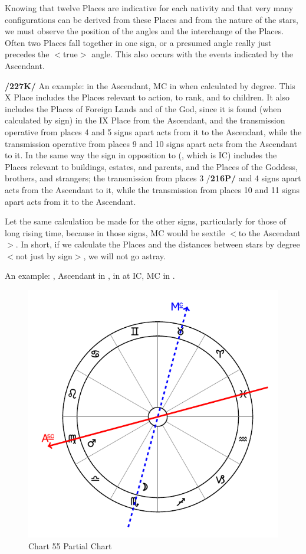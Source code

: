 Knowing that twelve Places are indicative for each nativity and that very many configurations can be derived from these Places and from
the nature of the stars, we must observe the position of the angles and the interchange of the Places. Often two Places fall together in one sign, or a presumed angle really just precedes the $<$true$>$ angle. This also occurs with the events indicated by the Ascendant.

\textbf{/227K/} An example: \Gemini\xspace in the Ascendant, MC in \Aquarius\xspace when calculated by degree. This X Place includes the Places relevant to action, to rank, and to children. It also includes the Places of Foreign Lands and of the God, since it is found (when calculated by sign) in the IX Place from the Ascendant, and the transmission operative from places 4 and 5 signs apart acts from it to the Ascendant, while the transmission operative from places 9 and 10 signs apart acts from the Ascendant to it. In the same way the
sign in opposition to \Aquarius\xspace (\Leo, which is IC) includes the Places relevant to buildings, estates, and parents, and the Places of the Goddess, brothers, and strangers; the transmission from places 3 /\textbf{216P/} and 4 signs apart acts from the Ascendant to it, while the transmission from places 10 and 11 signs apart acts from it to the Ascendant. 

Let the same calculation be made for the other signs, particularly for those of long rising time, because in those signs, MC would be sextile $<$to the Ascendant$>$. In short, if we calculate the Places and the distances between stars by degree $<$not just by sign$>$, we will not go astray.

An example: \Mars, Ascendant in \Virgo, \Moon\xspace in \Scorpio\xspace at IC, MC in \Taurus. 

\begin{figure}
\centering
\vspace{-20pt}
\includegraphics[width=.68\textwidth]{charts/5_09_2}
\caption{Chart 55 Partial Chart}
\label{fig:chart55}
\end{figure}

